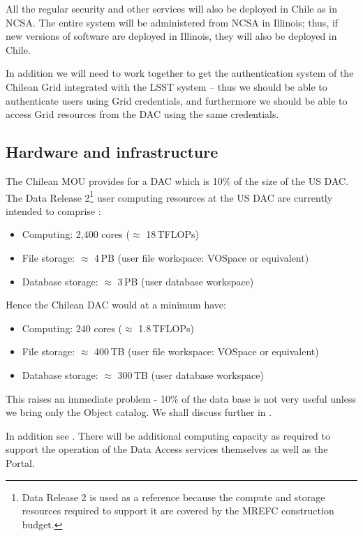 All the regular security and other services will also be deployed in Chile as in NCSA.
The entire system will be administered from NCSA in Illinois; thus, if new versions of software are deployed in Illinois, they will also be deployed in Chile.

In addition we will need to work together to get the authentication system of the Chilean Grid integrated with the LSST system  -- thus we should be able to authenticate users using Grid credentials, and furthermore we should be able to access Grid resources from the DAC using the same credentials.


\subsection{Hardware and infrastructure}\label{sec:hw}

The Chilean MOU provides for a DAC which is 10\% of the size of the US DAC.
The Data Release 2\footnote{Data Release 2 is used as a reference because the compute and storage resources required to support it are covered by the MREFC construction budget.} user computing resources at the US DAC are currently intended to comprise :
\begin{itemize}
\item Computing: 2,400 cores ($\approx$ 18\,TFLOPs)
\item File storage: $\approx$ 4\,PB  (user file workspace: VOSpace or equivalent)
\item Database storage: $\approx$ 3\,PB (user database workspace)
\end{itemize}


Hence the Chilean DAC would at a minimum have:
\begin{itemize}
\item Computing: 240 cores ($\approx$ 1.8\,TFLOPs)
\item File storage: $\approx$ 400\,TB  (user file workspace: VOSpace or equivalent)
\item Database storage: $\approx$ 300\,TB (user database workspace)
\end{itemize}

This raises an immediate problem - 10\% of the data base is not very useful unless we bring only the Object catalog.
We shall discuss further in  .

In addition see .
There will be additional computing capacity as required to support the operation of the Data Access services themselves as well as the Portal.



